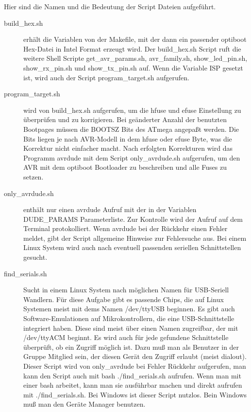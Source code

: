 Hier sind die Namen und die Bedeutung der Script Dateien aufgeführt.
\begin{description}

\item [build\_hex.sh] erhält die Variablen von der Makefile, mit der dann ein passender
optiboot Hex-Datei in Intel Format erzeugt wird.
Der build\_hex.sh Script ruft die weitere Shell Scripte  get\_avr\_params.sh,
avr\_family.sh, show\_led\_pin.sh, show\_rx\_pin.sh und show\_tx\_pin.sh auf.
Wenn die Variable ISP gesetzt ist, wird auch der Script program\_target.sh
aufgerufen.

\item [program\_target.sh] wird von build\_hex.sh aufgerufen, um die hfuse und efuse Einstellung
zu überprüfen und zu korrigieren. Bei geänderter Anzahl der benutzten Bootpages
müssen die BOOTSZ Bits des ATmega angepaßt werden. Die Bits liegen je nach AVR-Modell
in dem hfuse oder efuse Byte, was die Korrektur nicht einfacher macht.
Nach erfolgten Korrekturen wird das Programm avrdude mit dem Script only\_avrdude.sh aufgerufen,
um den AVR mit dem optiboot Bootloader zu beschreiben und alle Fuses zu setzen.

\item [only\_avrdude.sh] enthält nur einen avrdude Aufruf mit der in der Variablen
DUDE\_PARAMS Parameterliste. Zur Kontrolle wird der Aufruf auf dem Terminal protokolliert.
Wenn avrdude bei der Rückkehr einen Fehler meldet, gibt der Script allgemeine Hinweise
zur Fehlersuche aus. Bei einem Linux System wird auch nach eventuell passenden 
seriellen Schnittstellen gesucht.

\item [find\_serials.sh] Sucht in einem Linux System nach möglichen Namen für USB-Seriell
Wandlern. Für diese Aufgabe gibt es passende Chips, die auf Linux Systemen meist mit dems
Namen /dev/ttyUSB beginnen.
Es gibt auch Software-Emulationen auf Mikrokontrollern, die eine USB-Schnittstelle
integriert haben. Diese sind meist über einen Namen zugreifbar, der mit /dev/ttyACM beginnt.
Es wird auch für jede gefundene Schnittstelle überprüft, ob ein Zugriff möglich ist.
Dazu muß man als Benutzer in der Gruppe Mitglied sein, der diesen Gerät den Zugriff
erlaubt (meist dialout).
Dieser Script wird von only\_avrdude bei Fehler Rückkehr aufgerufen, man kann den
Script auch mit bash ./find\_serials.sh aufrufen.
Wenn man mit einer bash arbeitet, kann man sie ausführbar machen und direkt aufrufen
mit ./find\_serials.sh.
Bei Windows ist dieser Script nutzlos. Bein Windows muß man den Geräte Manager benutzen.


\end{description}

